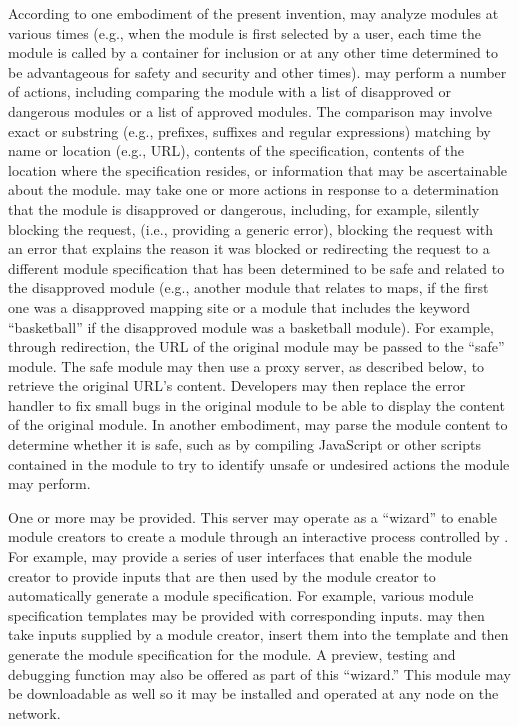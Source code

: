 According to one embodiment of the present
invention, \analysismodule{} may analyze modules at various
times (e.g., when the module is first selected by a user, each time
the module is called by a container for inclusion or at any other time
determined to be advantageous for safety and security and other
times). \analysismodule{} may perform a number of actions,
including comparing the module with a list of disapproved or dangerous
modules or a list of approved modules. The comparison may involve
exact or substring (e.g., prefixes, suffixes and regular expressions)
matching by name or location (e.g., URL), contents of the
specification, contents of the location where the specification
resides, or information that may be ascertainable about the
module. \analysismodule{} may take one or more actions in
response to a determination that the module is disapproved or
dangerous, including, for example, silently blocking the request,
(i.e., providing a generic error), blocking the request with an error
that explains the reason it was blocked or redirecting the request to
a different module specification that has been determined to be safe
and related to the disapproved module (e.g., another module that
relates to maps, if the first one was a disapproved mapping site or a
module that includes the keyword ``basketball'' if the
disapproved module was a basketball module). For example, through
redirection, the URL of the original module may be passed to the
``safe'' module. The safe module may then use a proxy
server, as described below, to retrieve the original URL's
content. Developers may then replace the error handler to fix small
bugs in the original module to be able to display the content of the
original module. In another embodiment, \analysismodule{} may
parse the module content to determine whether it is safe, such as by
compiling JavaScript or other scripts contained in the module to try
to identify unsafe or undesired actions the module may perform.



One or more \modulecreationservers{}
may be provided. This server may operate as a ``wizard''
to enable module creators to create a module through an interactive
process controlled by \modulecreationserver{}. For example,
\modulecreationserver{} may provide a series of user
interfaces that enable the module creator to provide inputs that are
then used by the module creator to automatically generate a module
specification. For example, various module specification templates may
be provided with corresponding inputs. \Modulecreationserver{} may
then take inputs supplied by a module creator, insert them into the
template and then generate the module specification for the module. A
preview, testing and debugging function may also be offered as part of
this ``wizard.'' This module may be downloadable as well so it may be
installed and operated at any node on the network.



